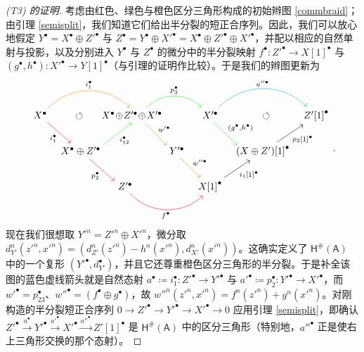 \begin{proof}[(\textup{T3}) 的证明]
	考虑由红色、绿色与橙色区分三角形构成的初始辫图 \eqref{commbraid}；由引理 \ref{semisplit}，我们知道它们给出半分裂的短正合序列。因此，我们可以放心地假定 $Y^\bullet=X^\bullet\oplus Z'^\bullet$ 与 $Z^\bullet=Y^\bullet\oplus X'^\bullet=X^\bullet\oplus Z'^\bullet\oplus X'^\bullet$，并配以相应的自然单射与投影，以及分别进入 $Y^\bullet$ 与 $Z^\bullet$ 的微分中的半分裂映射 $f^\bullet:Z'^\bullet\rightarrow X[1]^\bullet$ 与 $(g^\bullet,h^\bullet):X'^\bullet\rightarrow Y[1]^\bullet$（与引理的证明作比较）。于是我们的辫图更新为
	\[
	\begin{tikzcd}[column sep=0.2cm]
		X^\bullet \arrow[rr, orange, bend left = 45, "{i_1^\bullet}" black]\arrow[dr, red, "{i_1^\bullet}"' black] & \mkern-6mu\circlearrowleft & \mkern-24mu{X^\bullet\!\oplus\! {Z'^\bullet}\!\oplus\! {X'^\bullet}}\arrow[rr, green, bend left = 45, "{p_3^\bullet}" black]\arrow[dr, orange, end anchor={[xshift=-1.2ex, yshift=1.5ex]west}, "{w'^\bullet}" black] & & {X'^\bullet}\arrow[rr, cyan, bend left = 45, "{a''^\bullet}" black]\arrow[dr, green, end anchor={[xshift=1.3ex, yshift=1.5ex]west}, "{(g^\bullet,h^\bullet)}" black] & \mkern+12mu\circlearrowleft & {Z'[1]}^\bullet \\
		& X^\bullet\oplus Z'^\bullet\arrow[ur, green, start anchor={[xshift=-0.5ex,yshift=1.5ex]east}, "i_{12}^\bullet"' black]\arrow[dr, red, start anchor={[xshift=2ex]south}, end anchor={[xshift=-5.5ex, yshift=1.5ex]west}, "p_2^\bullet"' black] & & \mkern-12mu Y'^\bullet \arrow[dr, orange, start anchor={[yshift=0ex]south}, "w''^\bullet" black] & & {(X\oplus Z')[1]}^\bullet\arrow[ur, "{p_2[1]}^\bullet"'] \\
		& & \mkern-48mu Z'^\bullet\arrow[rr, red, bend right = 45, start anchor={[xshift=-2ex]south}, "f^\bullet"' black] & & {X[1]}^\bullet\arrow[ur, "{i_1[1]^\bullet}"']
	\end{tikzcd}.
	\]
	现在我们很想取 $Y'^n=Z'^n\oplus X'^n$，微分取 $d_{Y'}^n(z'^n,x'^n)=(d_{Z'}^n(z'^n)-h^n(x'^n),d_{X'}^n(x'^n))$。这确实定义了 $\mathsf{H^\#\!(A)}$ 中的一个复形 $(Y'^\bullet,d_{Y'}^\bullet)$，并且它还尊重橙色区分三角形的半分裂。于是补全该图的蓝色虚线箭头就是自然态射 $a^\bullet\coloneqq i_1^\bullet:Z'^\bullet\rightarrow Y'^\bullet$ 与 $a'^\bullet\coloneqq p_2^\bullet: Y'^\bullet \rightarrow X'^\bullet$，而 $w'^\bullet= p_{23}^\bullet$、$w''^\bullet=(f^\bullet\oplus g^\bullet)$，故 $w''^n(z'^n,x'^n)=f^n(z'^n) + g^n(x'^n)$。对刚构造的半分裂短正合序列 $0\rightarrow Z'^\bullet\rightarrow Y'^\bullet\rightarrow X'^\bullet\rightarrow 0$ 应用引理 \ref{semisplit}，即确认 $Z'^\bullet\xrightarrow{a^\bullet} Y'^\bullet\xrightarrow{a'^\bullet} X'^\bullet\xrightarrow{a''^\bullet} Z'[1]^\bullet$ 是 $\mathsf{H^\#\!(A)}$ 中的区分三角形（特别地，$a''^\bullet$ 正是使右上三角形交换的那个态射）。
	

\end{proof}
